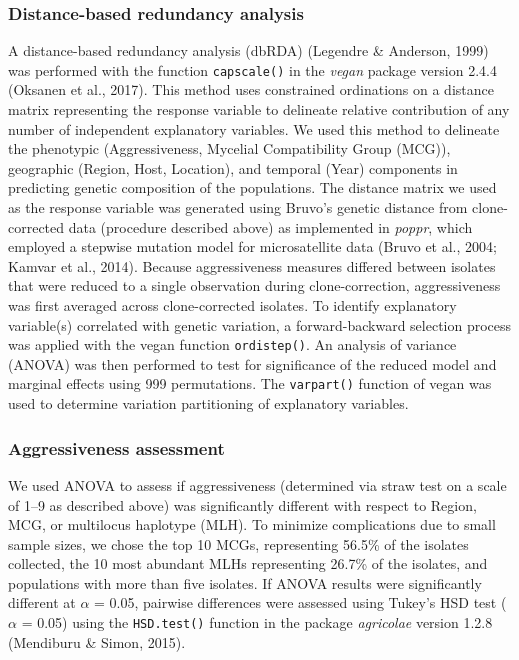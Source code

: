 \subsubsection*{Distance-based redundancy
analysis}\label{distance-based-redundancy-analysis}

A distance-based redundancy analysis (dbRDA) (Legendre \& Anderson,
1999) was performed with the function \texttt{capscale()} in the
\emph{vegan} package version 2.4.4 (Oksanen et al., 2017). This method
uses constrained ordinations on a distance matrix representing the
response variable to delineate relative contribution of any number of
independent explanatory variables. We used this method to delineate the
phenotypic (Aggressiveness, Mycelial Compatibility Group (MCG)),
geographic (Region, Host, Location), and temporal (Year) components in
predicting genetic composition of the populations. The distance matrix
we used as the response variable was generated using Bruvo's genetic
distance from clone-corrected data (procedure described above) as
implemented in \emph{poppr}, which employed a stepwise mutation model
for microsatellite data (Bruvo et al., 2004; Kamvar et al., 2014).
Because aggressiveness measures differed between isolates that were
reduced to a single observation during clone-correction, aggressiveness
was first averaged across clone-corrected isolates. To identify
explanatory variable(s) correlated with genetic variation, a
forward-backward selection process was applied with the vegan function
\texttt{ordistep()}. An analysis of variance (ANOVA) was then performed
to test for significance of the reduced model and marginal effects using
999 permutations. The \texttt{varpart()} function of vegan was used to
determine variation partitioning of explanatory variables.

\subsubsection*{Aggressiveness
assessment}\label{aggressiveness-assessment}

We used ANOVA to assess if aggressiveness (determined via straw test on
a scale of 1--9 as described above) was significantly different with
respect to Region, MCG, or multilocus haplotype (MLH). To minimize
complications due to small sample sizes, we chose the top 10 MCGs,
representing 56.5\% of the isolates collected, the 10 most abundant MLHs
representing 26.7\% of the isolates, and populations with more than five
isolates. If ANOVA results were significantly different at \(\alpha\) =
0.05, pairwise differences were assessed using Tukey's HSD test
(\(\alpha\) = 0.05) using the \texttt{HSD.test()} function in the
package \emph{agricolae} version 1.2.8 (Mendiburu \& Simon, 2015).

